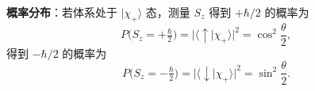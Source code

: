\begin{enumerate}[label=\textbf{\arabic*.}, leftmargin=2em, itemsep=0.8em]
\textbf{概率分布}：若体系处于 $|\chi_+\rangle$ 态，测量 $S_z$ 得到 $+\hbar/2$ 的概率为
\[
    P\bigl(S_z = +\tfrac{\hbar}{2}\bigr) = |\langle\uparrow|\chi_+\rangle|^2 = \cos^2\frac{\theta}{2},
\]
得到 $-\hbar/2$ 的概率为
\[
    P\bigl(S_z = -\tfrac{\hbar}{2}\bigr) = |\langle\downarrow|\chi_+\rangle|^2 = \sin^2\frac{\theta}{2}.
\]

\end{enumerate}
